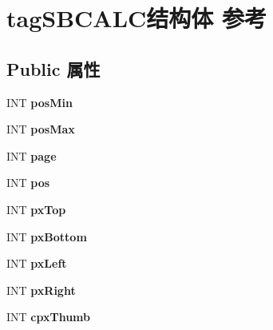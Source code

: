 \hypertarget{structtag_s_b_c_a_l_c}{}\section{tag\+S\+B\+C\+A\+L\+C结构体 参考}
\label{structtag_s_b_c_a_l_c}
\subsection*{Public 属性}
\begin{DoxyCompactItemize}
\item 
\mbox{\label{structtag_s_b_c_a_l_c_a2c682aaf7c20b5613dd01c4e59dec597}} 
I\+NT {\bfseries pos\+Min}
\item 
\mbox{\label{structtag_s_b_c_a_l_c_ab65f234204a69038c582721f277afc2b}} 
I\+NT {\bfseries pos\+Max}
\item 
\mbox{\label{structtag_s_b_c_a_l_c_abb3ce224cf41932a71481978f41c0024}} 
I\+NT {\bfseries page}
\item 
\mbox{\label{structtag_s_b_c_a_l_c_ae88003c9298ee2f2c98c6bc2b28ebaa2}} 
I\+NT {\bfseries pos}
\item 
\mbox{\label{structtag_s_b_c_a_l_c_aa2f981732e805aa0ae013832335db1ab}} 
I\+NT {\bfseries px\+Top}
\item 
\mbox{\label{structtag_s_b_c_a_l_c_abcf11131b569b472af306ca51d7fa0f8}} 
I\+NT {\bfseries px\+Bottom}
\item 
\mbox{\label{structtag_s_b_c_a_l_c_a75136a26f1e94dd833926818ac6a0bdd}} 
I\+NT {\bfseries px\+Left}
\item 
\mbox{\label{structtag_s_b_c_a_l_c_a0390ba076114d33209ab5df3f48848f0}} 
I\+NT {\bfseries px\+Right}
\item 
\mbox{\label{structtag_s_b_c_a_l_c_ae0378cf6fe3240dffe7f62bcb16e561b}} 
I\+NT {\bfseries cpx\+Thumb}
\item 
\mbox{\label{structtag_s_b_c_a_l_c_a924d94326067ddf99be5d11d84ce9387}} 

\end{DoxyCompactItemize}
